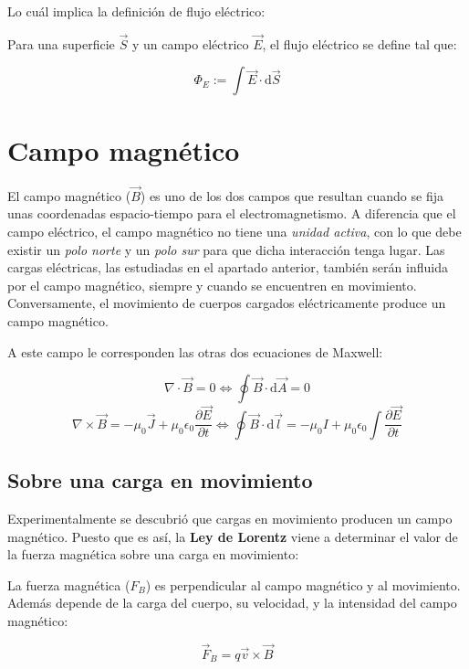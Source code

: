 \documentclass[10pt]{article}
\newcommand{\diff}{\mathrm{d}}
\begin{document}
Lo cuál implica la definición de flujo eléctrico:

\begin{definition}
  Para una superficie $ \vec{S} $ y un campo eléctrico $ \vec{E} $, el flujo eléctrico se define tal que:

  \[ \Phi_E := \int \vec{E} \cdot \diff \vec{S} \]
\end{definition}


\section{Campo magnético}

El campo magnético ($ \vec{B} $) es uno de los dos campos que resultan cuando se fija unas coordenadas espacio-tiempo para el electromagnetismo.
A diferencia que el campo eléctrico, el campo magnético no tiene una \textit{unidad activa}, con lo que debe existir un \textit{polo norte} y un \textit{polo sur} para que dicha
interacción tenga lugar.
Las cargas eléctricas, las estudiadas en el apartado anterior, también serán influida por el campo magnético, siempre y cuando se encuentren
en movimiento. Conversamente, el movimiento de cuerpos cargados eléctricamente produce un campo magnético.

A este campo le corresponden las otras dos ecuaciones de Maxwell:

\[ \nabla \cdot \vec{B} = 0 \iff \oint \vec{B} \cdot \diff \vec{A} = 0 \]
\[ \nabla \times \vec{B} = -\mu_0 \vec{J} + \mu_0 \epsilon_0 \frac{\partial \vec{E}}{\partial t} \iff \oint \vec{B} \cdot \diff \vec{l} =  -\mu_0 I + \mu_0 \epsilon_0 \int \frac{\partial \vec{E}}{\partial t}\]

\subsection{Sobre una carga en movimiento}

Experimentalmente se descubrió que cargas en movimiento producen un campo magnético. Puesto que es así, la \textbf{Ley de Lorentz} viene a determinar el valor de la fuerza magnética
sobre una carga en movimiento:

\begin{theorem}
  La fuerza magnética ($ F_B $) es perpendicular al campo magnético y al movimiento. Además depende de la carga del cuerpo, su velocidad, y
  la intensidad del campo magnético:

  \[ \vec{F}_B = q \vec{v} \times \vec{B} \]
\end{theorem}
\end{document}
